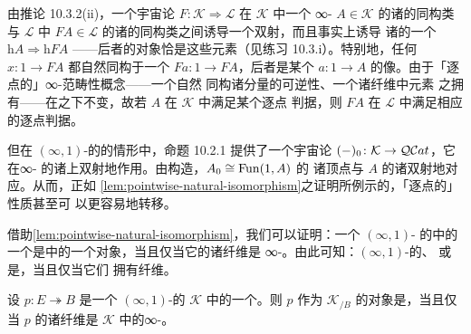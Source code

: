\begin{observation}\label{obs:elements-of-underlying-qcat}
由推论 10.3.2(ii)，一个宇宙论\trBiequivalence{}
$F\colon\mathcal{K}\Rightarrow\mathcal{L}$ 在 $\mathcal{K}$ 中一个%
∞-\trCategory{} $A\in\mathcal{K}$ 的诸\trElement{}的同构类与 $\mathcal{L}$ 中
$FA\in\mathcal{L}$ 的诸\trElement{}的同构类之间诱导一个双射，而且事实上诱导%
诸\trHomotopyCategory{}的一个\trEquivalence{} $\mathrm{h}A\Rightarrow\mathrm{h}FA$
——后者的对象恰是这些元素（见练习 10.3.i）。特别地，任何\trElement{}
$x\colon 1\to FA$ 都自然同构于一个\trElement{} $Fa\colon 1\to FA$，后者是某个%
\trElement{} $a\colon 1\to A$ 的像。由于「逐点的」∞-范畴性概念——一个自然
同构诸分量的可逆性、一个\trCocartesianFibration{}诸纤维中\trTerminal{}元素
之拥有——在\trIsomorphism{}之下不变，故若 $A$ 在 $\mathcal{K}$ 中满足某个逐点
判据，则 $FA$ 在 $\mathcal{L}$ 中满足相应的逐点判据。
\end{observation}

但在 $(\infty,1)$-\trCategory{}的\trInfinityCosmos{}的情形中，命题 10.2.1 提供了一个宇宙论%
\trBiequivalence{} $(-)_{0}\colon\mathcal{K}\to\mathcal{Q}\mathcal{C}at$，它在∞-%
\trCategory{}的诸\trElement{}上双射地作用。由构造，$A_{0}\cong\operatorname{Fun}(1,A)$ 的
诸顶点与 $A$ 的诸\trElement{}双射地对应。从而，正如%
\cref{lem:pointwise-natural-isomorphism}之证明所例示的，「逐点的」性质甚至可
以更容易地转移。

借助\cref{lem:pointwise-natural-isomorphism}，我们可以证明：一个 $(\infty,1)$-%
\trCategory{}的\trInfinityCosmos{}中的一个\trIsofibration{}是\trSliceInfinityCosmos{}中的一个\trDiscrete{}对象，当且仅当它的诸纤维是\trDiscrete{}%
∞-\trCategory。由此可知：$(\infty,1)$-\trCategory{}的\trCocartesianFibration、%
\trCartesianFibration{}或\trTwoSidedFibration{}是\trDiscrete，当且仅当它们
拥有\trDiscrete{}纤维。

\begin{proposition}\label{prop:discrete-fibers-isofibration}
设 $p\colon E\twoheadrightarrow B$ 是一个 $(\infty,1)$-\trCategory{}的%
\trInfinityCosmos{} $\mathcal{K}$ 中的一个\trIsofibration。则 $p$ 作为
$\mathcal{K}_{/B}$ 的对象是\trDiscrete，当且仅当 $p$ 的诸纤维是 $\mathcal{K}$
中的\trDiscrete{}∞-\trCategory。
\end{proposition}

